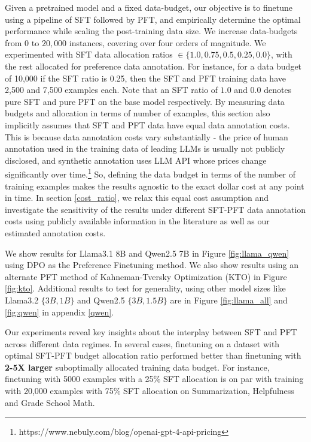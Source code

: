 Given a pretrained model and a fixed data-budget, our objective is to finetune using a pipeline of SFT followed by PFT, and empirically determine the optimal performance while scaling the post-training data size. We increase data-budgets from $0$ to $20,000$ instances, covering over four orders of magnitude. We experimented with SFT data allocation ratios $\in\{1.0, 0.75, 0.5, 0.25, 0.0\}$, with the rest allocated for preference data annotation. For instance, for a data budget of 10,000 if the SFT ratio is 0.25, then the SFT and PFT training data have 2,500 and 7,500 examples each. Note that an SFT ratio of $1.0$ and $0.0$ denotes pure SFT and pure PFT on the base model respectively. By measuring data budgets and allocation in terms of number of examples, this section also implicitly assumes that SFT and PFT data have equal data annotation costs. This is because data annotation costs vary substantially - the price of human annotation used in the training data of leading LLMs is usually not publicly disclosed, and synthetic annotation uses LLM API whose prices change significantly over time.\footnote{https://www.nebuly.com/blog/openai-gpt-4-api-pricing} So, defining the data budget in terms of the number of training examples makes the results agnostic to the exact dollar cost at any point in time. In section \ref{cost_ratio}, we relax this equal cost assumption and investigate the sensitivity of the results under different SFT-PFT data annotation costs using publicly available information in the literature as well as our estimated annotation costs.

We show results for Llama3.1 8B and Qwen2.5 7B in Figure \ref{fig:llama_qwen} using DPO as the Preference Finetuning method. We also show results using an alternate PFT method of Kahneman-Tversky Optimization (KTO) \citep{ethayarajh2024kto} in Figure \ref{fig:kto}. Additional results to test for generality, using other model sizes like Llama3.2 $\{3B, 1B\}$ and Qwen2.5 $\{3B, 1.5B\}$ are in Figure \ref{fig:llama_all} and \ref{fig:qwen} in appendix \ref{qwen}.

Our experiments reveal key insights about the interplay between SFT and PFT across different data regimes. 
In several cases, finetuning on a dataset with optimal SFT-PFT budget allocation ratio performed better than finetuning with \textbf{2-5X larger} suboptimally allocated training data budget. For instance, finetuning with 5000 examples with a 25\% SFT allocation is on par with training with 20,000 examples with 75\% SFT allocation on Summarization, Helpfulness and Grade School Math. 



